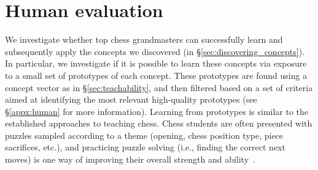 \documentclass{article}
\begin{document}
\section{Human evaluation} \label{sec:human}
We investigate whether top chess grandmasters can successfully learn and subsequently apply the concepts we discovered (in \S\ref{sec:discovering_concepts}). In particular, we investigate if it is possible to learn these concepts via exposure to a small set of prototypes of each concept.
These prototypes are found using a concept vector as in \S\ref{sec:teachability}, and then filtered based on a set of criteria aimed at identifying the most relevant high-quality prototypes (see \S\ref{appx:human} for more information).
Learning from prototypes is similar to the established approaches to teaching chess. Chess students are often presented with puzzles sampled according to a theme (opening, chess position type, piece sacrifices, etc.), and practicing puzzle solving (i.e., finding the correct next moves) is one way of improving their overall strength and ability~\citep{chuchelov_interview}. 
\end{document}
